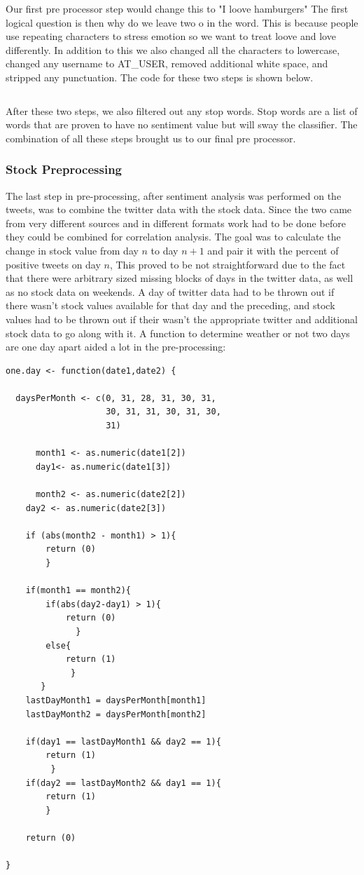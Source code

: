 \documentclass{acm_proc_article-sp}
\begin{document}
Our first pre processor step would
change this to "I loove hamburgers" The first logical question is then why do
we leave two o in the word. This is because people use repeating characters to
stress emotion so we want to treat loove and love differently. In addition to
this we also changed all the characters to lowercase, changed any username to
AT\_USER, removed additional white space, and stripped any punctuation. The
code for these two steps is shown below.

\inputminted{python}{examples/preTweet.py}

After these two steps, we also filtered out any stop words. Stop words are a
list of words that are proven to have no sentiment value but will sway the
classifier. The combination of all these steps brought us to our final pre
processor.

\subsubsection{Stock Preprocessing}
 
The last step in pre-processing, after sentiment analysis was performed on the
tweets, was to combine the twitter data with the stock data. Since the two came
from very different sources and in different formats work had to be done before
they could be combined for correlation analysis. The goal was to calculate the
change in stock value from day $n$ to day $n+1$ and pair it with the percent of
positive tweets on day $n$, This proved to be not straightforward due to the
fact that there were arbitrary sized missing blocks of days in the twitter
data, as well as no stock data on weekends. A day of twitter data had to be
thrown out if there wasn't stock values available for that day and the
preceding, and stock values had to be thrown out if their wasn't the
appropriate twitter and additional stock data to go along with it. A function
to determine weather or not two days are one day apart aided a lot in the
pre-processing:

\begin{verbatim}
one.day <- function(date1,date2) {

  daysPerMonth <- c(0, 31, 28, 31, 30, 31, 
                    30, 31, 31, 30, 31, 30, 
                    31)
       
      month1 <- as.numeric(date1[2])
      day1<- as.numeric(date1[3])

      month2 <- as.numeric(date2[2])
    day2 <- as.numeric(date2[3])

    if (abs(month2 - month1) > 1){
        return (0)
        }

    if(month1 == month2){
        if(abs(day2-day1) > 1){
            return (0)
              }
        else{
            return (1)
             }
       }
    lastDayMonth1 = daysPerMonth[month1]
    lastDayMonth2 = daysPerMonth[month2]

    if(day1 == lastDayMonth1 && day2 == 1){
        return (1)
         }
    if(day2 == lastDayMonth2 && day1 == 1){
        return (1)
        }

    return (0)

}

\end{verbatim}
\end{document}
